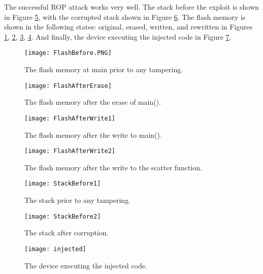 The successful ROP attack works very well. The stack before the exploit is shown in Figure \ref{fig::st1}, with the corrupted stack shown in Figure \ref{fig::st2}. The flash memory is shown in the following states: original, erased, written, and rewritten in Figures \ref{fig::fl0}, \ref{fig::fl1}, \ref{fig::fl2}, \ref{fig::fl3}. And finally, the device executing the injected code in Figure \ref{fig::ex}. 

\begin{figure}[p]
	\centering
	\texttt{[image: FlashBefore.PNG]}
	\caption{The flash memory at main prior to any tampering. }\label{fig::fl0}
\end{figure}
\begin{figure}[p]
	\centering
	\texttt{[image: FlashAfterErase]}
	\caption{The flash memory after the erase of main(). }\label{fig::fl1}
\end{figure}

\begin{figure}[p]
	\centering
	\texttt{[image: FlashAfterWrite1]}
	\caption{The flash memory after the write to main(). }\label{fig::fl2}
\end{figure}

\begin{figure}[p]
	\centering
	\texttt{[image: FlashAfterWrite2]}
	\caption{The flash memory after the write to the scatter function. }\label{fig::fl3}
\end{figure}

\begin{figure}[p]
	\centering
	\texttt{[image: StackBefore1]}
	\caption{The stack prior to any tampering. }\label{fig::st1}
\end{figure}
\begin{figure}[p]
	\centering
	\texttt{[image: StackBefore2]}
	\caption{The stack after corruption. }\label{fig::st2}
\end{figure}

\begin{figure}[p]
	\centering
	\texttt{[image: injected]}
	\caption{The device executing the injected code. }\label{fig::ex}
\end{figure}

